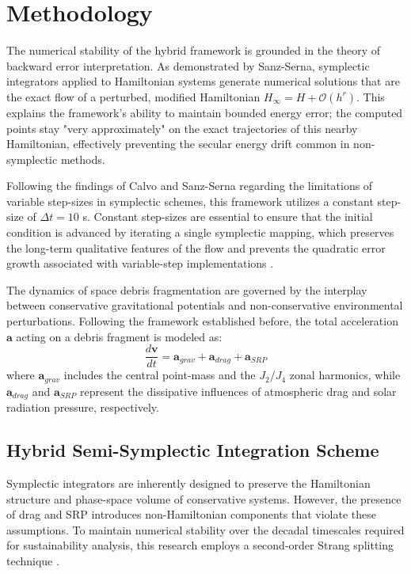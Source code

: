 \documentclass[letterpaper,11pt]{AAS}
\begin{document}
\section{Methodology}

The numerical stability of the hybrid framework is grounded in the theory of backward error interpretation. As demonstrated by Sanz-Serna, symplectic integrators applied to Hamiltonian systems generate numerical solutions that are the exact flow of a perturbed, modified Hamiltonian $H_{\infty} = H + \mathcal{O}(h^r)$. This explains the framework's ability to maintain bounded energy error; the computed points stay "very approximately" on the exact trajectories of this nearby Hamiltonian, effectively preventing the secular energy drift common in non-symplectic methods\cite{sanz-serna_symplectic_1992}.

Following the findings of Calvo and Sanz-Serna regarding the limitations of variable step-sizes in symplectic schemes, this framework utilizes a constant step-size of $\Delta t = 10$ s. Constant step-sizes are essential to ensure that the initial condition is advanced by iterating a single symplectic mapping, which preserves the long-term qualitative features of the flow and prevents the quadratic error growth associated with variable-step implementations \cite{sanz-serna_symplectic_1992}.

The dynamics of space debris fragmentation are governed by the interplay between conservative gravitational potentials and non-conservative environmental perturbations. Following the framework established before, the total acceleration $\mathbf{a}$ acting on a debris fragment is modeled as:
\begin{equation}
    \frac{d\mathbf{v}}{dt} = \mathbf{a}_{grav} + \mathbf{a}_{drag} + \mathbf{a}_{SRP}
\end{equation}
where $\mathbf{a}_{grav}$ includes the central point-mass and the $J_2/J_4$ zonal harmonics, while $\mathbf{a}_{drag}$ and $\mathbf{a}_{SRP}$ represent the dissipative influences of atmospheric drag and solar radiation pressure, respectively.

\subsection{Hybrid Semi-Symplectic Integration Scheme}
Symplectic integrators are inherently designed to preserve the Hamiltonian structure and phase-space volume of conservative systems. However, the presence of drag and SRP introduces non-Hamiltonian components that violate these assumptions. To maintain numerical stability over the decadal timescales required for sustainability analysis, this research employs a second-order Strang splitting technique \cite{puerta-ibarra_advanced_2025}.
\end{document}
